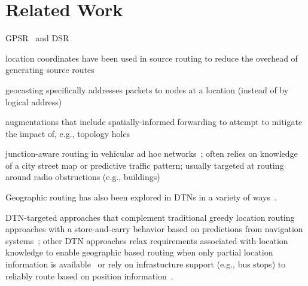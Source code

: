 \section{Related Work}

GPSR~\cite{karp00:gpsr} and DSR~\cite{johnson96:dynamic}

location coordinates have been used in source routing to reduce the overhead of generating source routes~\cite{basagni99:dynamic}

geocasting specifically addresses packets to nodes at a location (instead of by logical address)~\cite{florian13:overdrive, navas97:geocast}

augmentations that include spatially-informed forwarding to attempt to mitigate the impact of, e.g., topology holes~\cite{tian03:spatially}

junction-aware routing in vehicular ad hoc networks~\cite{jerbi07:improved, lochert05:geographic}; often relies on knowledge of a city street map or predictive traffic pattern; usually targeted at routing around radio obstructions (e.g., buildings)

Geographic routing has also been explored in DTNs in a variety of ways~\cite{soares14:geospray}.

DTN-targeted approaches that complement traditional greedy location routing approaches with a store-and-carry behavior based on predictions from navigation systems~\cite{cheng10:geodtn}; other DTN approaches relax requirements associated with location knowledge to enable geographic based routing when only partial location information is available~\cite{kuiper11:geographical} or rely on infrastucture support (e.g., bus stops) to reliably route based on position information~\cite{park12:position}.